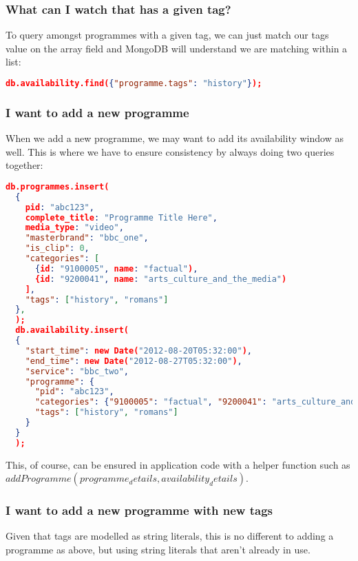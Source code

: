 \documentclass[11pt,a4paper]{article}
\begin{document}
\subsubsection{What can I watch that has a given tag?}

To query amongst programmes with a given tag, we can just match our
tags value on the
array field and MongoDB will understand we are matching within
a list:

\begin{lstlisting}[language=json]
  db.availability.find({"programme.tags": "history"});
\end{lstlisting}

\subsubsection{I want to add a new programme}

When we add a new programme, we may want to add its availability
window as well. This is where we have to ensure consistency by
always doing two queries together:

\begin{lstlisting}[language=json]
  db.programmes.insert(
  {
    pid: "abc123",
    complete_title: "Programme Title Here",
    media_type: "video",
    "masterbrand": "bbc_one",
    "is_clip": 0,
    "categories": [
      {id: "9100005", name: "factual"),
      {id: "9200041", name: "arts_culture_and_the_media")
    ],
    "tags": ["history", "romans"]
  },
  );
  db.availability.insert(
  {
    "start_time": new Date("2012-08-20T05:32:00"),
    "end_time": new Date("2012-08-27T05:32:00"),
    "service": "bbc_two",
    "programme": {
      "pid": "abc123",
      "categories": {"9100005": "factual", "9200041": "arts_culture_and_the_media"},
      "tags": ["history", "romans"]
    }
  }
  );
\end{lstlisting}

This, of course, can be ensured in application code with a helper function
such as $addProgramme(programme_details, availability_details)$.

\subsubsection{I want to add a new programme with new tags}

Given that tags are modelled as string literals, this is no different to adding
a programme as above, but using string literals that aren't already in use.
\end{document}
